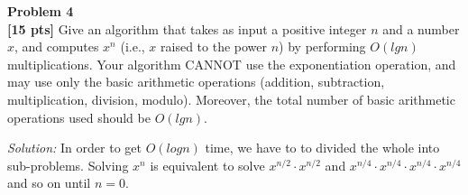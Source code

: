\documentclass{article}
\newenvironment{problem}[2][Problem]
    { \begin{mdframed}[backgroundcolor=gray!20] \textbf{#1 #2} \\}
    {  \end{mdframed}}
\newenvironment{solution}
    {\textit{Solution:}}
    {}
\begin{document}
\newpage
\begin{problem}{4}
\textbf{[15 pts]} 
Give an algorithm that takes as input a positive integer $n$ and a number $x$, and computes $x^n$ (i.e., $x$ raised to the power $n$) by performing $O(lgn)$ multiplications. Your algorithm CANNOT use the exponentiation operation, and may use only the basic arithmetic operations (addition, subtraction, multiplication, division, modulo). Moreover, the total number of basic arithmetic operations used should be $O(lg n)$.
\end{problem}
\begin{solution}
In order to get $O(logn)$ time, we have to to divided the whole into sub-problems. Solving $x^n$ is equivalent to solve $x^{n/2}\cdot x^{n/2}$ and $x^{n/4}\cdot x^{n/4}\cdot x^{n/4}\cdot x^{n/4}$ and so on until $n = 0$.
	\begin{algorithm}
	\end{algorithm}
\end{solution}
\end{document}
